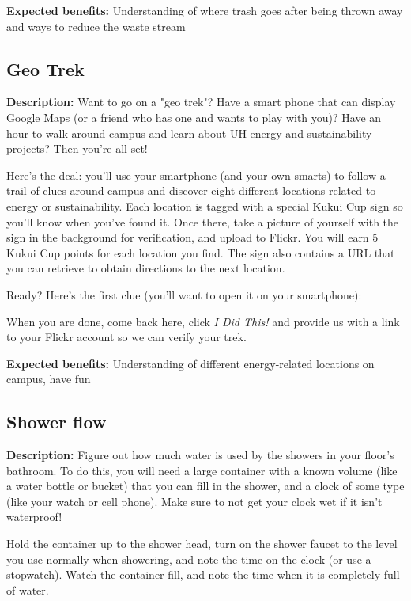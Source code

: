 \vspace{2ex}
\textbf{Expected benefits:} Understanding of where trash goes after being thrown away and ways to reduce the waste stream


\subsection{Geo Trek}

\textbf{Description:} Want to go on a "geo trek"? Have a smart phone that can display Google Maps (or a friend who has one and wants to play with you)? Have an hour to walk around campus and learn about UH energy and sustainability projects? Then you're all set!

Here's the deal: you'll use your smartphone (and your own smarts) to follow a trail of clues around campus and discover eight different locations related to energy or sustainability. Each location is tagged with a special Kukui Cup sign so you'll know when you've found it. Once there, take a picture of yourself with the sign in the background for verification, and upload to Flickr. You will earn 5 Kukui Cup points for each location you find.  The sign also contains a URL that you can retrieve to obtain directions to the next location.

Ready?  Here's the first clue (you'll want to open it on your smartphone): 

When you are done, come back here, click \emph{I Did This!} and provide us with a link to your Flickr account so we can verify your trek.

\vspace{2ex}
\textbf{Expected benefits:} Understanding of different energy-related locations on campus, have fun


\subsection{Shower flow}

\textbf{Description:} Figure out how much water is used by the showers in your floor's bathroom. To do this, you will need a large container with a known volume (like a water bottle or bucket) that you can fill in the shower, and a clock of some type (like your watch or cell phone). Make sure to not get your clock wet if it isn't waterproof!

Hold the container up to the shower head, turn on the shower faucet to the level you use normally when showering, and note the time on the clock (or use a stopwatch). Watch the container fill, and note the time when it is completely full of water.

